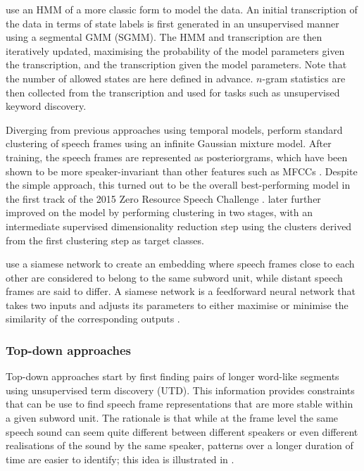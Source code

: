 \textcite{siu2014unsupervised} use an HMM of a more classic form to model the data.
An initial transcription of the data in terms of state labels is first generated in an unsupervised manner using a segmental GMM (SGMM).
The HMM and transcription are then iteratively updated, maximising the probability of the model parameters given the transcription, and the transcription given the model parameters.
Note that the number of allowed states are here defined in advance.
$n$-gram statistics are then collected from the transcription and used for tasks such as unsupervised keyword discovery.

Diverging from previous approaches using temporal models, \textcite{chen2015parallel} perform standard clustering of speech frames using an infinite Gaussian mixture model.
After training, the speech frames are represented as posteriorgrams, which have been shown to be more speaker-invariant than other features such as MFCCs \parencite{zhang2010towards}.
Despite the simple approach, this turned out to be the overall best-performing model in the first track of the 2015 Zero Resource Speech Challenge \parencite{versteegh2016zero}.
\textcite{heck2016unsupervised} later further improved on the model by performing clustering in two stages, with an intermediate supervised dimensionality reduction step using the clusters derived from the first clustering step as target classes.

\textcite{synnaeve2016temporal} use a siamese network to create an embedding where speech frames close to each other are considered to belong to the same subword unit, while distant speech frames are said to differ.
A siamese network is a feedforward neural network that takes two inputs and adjusts its parameters to either maximise or minimise the similarity of the corresponding outputs \parencite{bromley1994signature}.

\subsubsection{Top-down approaches}

Top-down approaches start by first finding pairs of longer word-like segments using unsupervised term discovery (UTD).
This information provides constraints that can be use to find speech frame representations that are more stable within a given subword unit.
The rationale is that while at the frame level the same speech sound can seem quite different between different speakers or even different realisations of the sound by the same speaker, patterns over a longer duration of time are easier to identify; this idea is illustrated in \textcite{jansen2013weak}.

